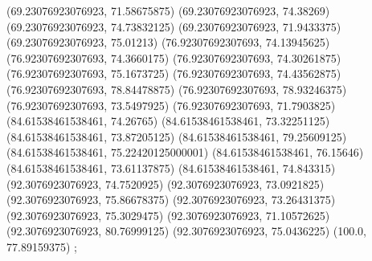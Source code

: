 {{{		(69.23076923076923, 71.58675875)
		(69.23076923076923, 74.38269)
		(69.23076923076923, 74.73832125)
		(69.23076923076923, 71.9433375)
		(69.23076923076923, 75.01213)
		(76.92307692307693, 74.13945625)
		(76.92307692307693, 74.3660175)
		(76.92307692307693, 74.30261875)
		(76.92307692307693, 75.1673725)
		(76.92307692307693, 74.43562875)
		(76.92307692307693, 78.84478875)
		(76.92307692307693, 78.93246375)
		(76.92307692307693, 73.5497925)
		(76.92307692307693, 71.7903825)
		(84.61538461538461, 74.26765)
		(84.61538461538461, 73.32251125)
		(84.61538461538461, 73.87205125)
		(84.61538461538461, 79.25609125)
		(84.61538461538461, 75.22420125000001)
		(84.61538461538461, 76.15646)
		(84.61538461538461, 73.61137875)
		(84.61538461538461, 74.843315)
		(92.3076923076923, 74.7520925)
		(92.3076923076923, 73.0921825)
		(92.3076923076923, 75.86678375)
		(92.3076923076923, 73.26431375)
		(92.3076923076923, 75.3029475)
		(92.3076923076923, 71.10572625)
		(92.3076923076923, 80.76999125)
		(92.3076923076923, 75.0436225)
		(100.0, 77.89159375)
	};

}}
